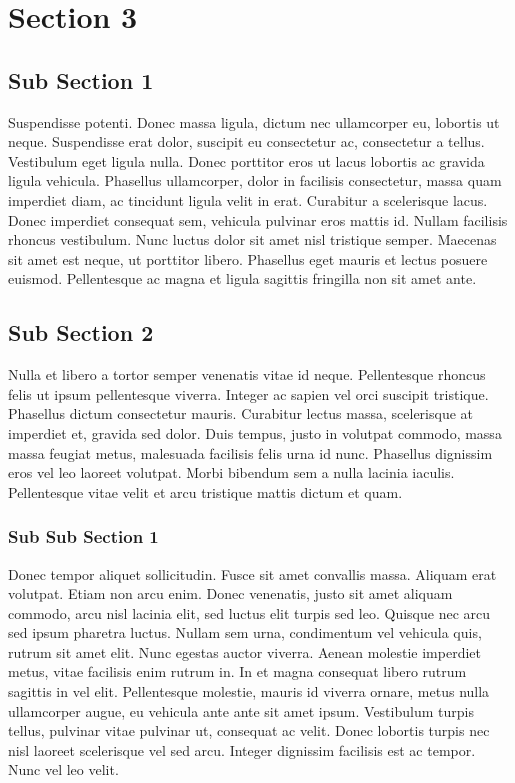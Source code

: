 \documentclass[../thesis.tex]{subfiles}
\begin{document}
\section{Section 3}

\subsection{Sub Section 1}
Suspendisse potenti. Donec massa ligula, dictum nec ullamcorper eu, lobortis ut neque. Suspendisse erat dolor, suscipit eu consectetur ac, consectetur a tellus. Vestibulum eget ligula nulla. Donec porttitor eros ut lacus lobortis ac gravida ligula vehicula. Phasellus ullamcorper, dolor in facilisis consectetur, massa quam imperdiet diam, ac tincidunt ligula velit in erat. Curabitur a scelerisque lacus. Donec imperdiet consequat sem, vehicula pulvinar eros mattis id. Nullam facilisis rhoncus vestibulum. Nunc luctus dolor sit amet nisl tristique semper. Maecenas sit amet est neque, ut porttitor libero. Phasellus eget mauris et lectus posuere euismod. Pellentesque ac magna et ligula sagittis fringilla non sit amet ante.

\subsection{Sub Section 2}
Nulla et libero a tortor semper venenatis vitae id neque. Pellentesque rhoncus felis ut ipsum pellentesque viverra. Integer ac sapien vel orci suscipit tristique. Phasellus dictum consectetur mauris. Curabitur lectus massa, scelerisque at imperdiet et, gravida sed dolor. Duis tempus, justo in volutpat commodo, massa massa feugiat metus, malesuada facilisis felis urna id nunc. Phasellus dignissim eros vel leo laoreet volutpat. Morbi bibendum sem a nulla lacinia iaculis. Pellentesque vitae velit et arcu tristique mattis dictum et quam.

\subsubsection{Sub Sub Section 1}
Donec tempor aliquet sollicitudin. Fusce sit amet convallis massa. Aliquam erat volutpat. Etiam non arcu enim. Donec venenatis, justo sit amet aliquam commodo, arcu nisl lacinia elit, sed luctus elit turpis sed leo. Quisque nec arcu sed ipsum pharetra luctus. Nullam sem urna, condimentum vel vehicula quis, rutrum sit amet elit. Nunc egestas auctor viverra. Aenean molestie imperdiet metus, vitae facilisis enim rutrum in. In et magna consequat libero rutrum sagittis in vel elit. Pellentesque molestie, mauris id viverra ornare, metus nulla ullamcorper augue, eu vehicula ante ante sit amet ipsum. Vestibulum turpis tellus, pulvinar vitae pulvinar ut, consequat ac velit. Donec lobortis turpis nec nisl laoreet scelerisque vel sed arcu. Integer dignissim facilisis est ac tempor. Nunc vel leo velit.
\end{document}
